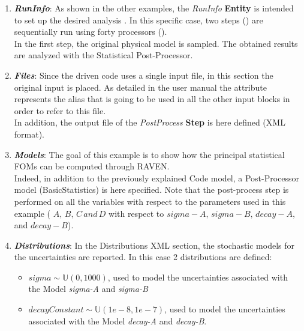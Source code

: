 \begin{enumerate}
   \item \textbf{\textit{RunInfo}}:
   As shown in the other examples, the \textit{RunInfo} \textbf{Entity} is intended  to set up the desired analysis . In this specific case, two steps  () are  sequentially run
   using forty processors ().
   \\In the first step, the original physical model is sampled. The obtained results are  analyzed with the Statistical Post-Processor.
   \item \textbf{\textit{Files}}:
   Since the driven code uses a single input file, in this section the original input is placed. As detailed in the user manual
   the attribute   represents the alias that is going to be
   used in all the other input blocks in order to refer to this file.
   \\In addition, the output file of the \textit{PostProcess} \textbf{Step} is
   here defined (XML format).
   \item \textbf{\textit{Models}}:
 The goal of this example is to show how the
 principal statistical FOMs can be computed through RAVEN.
 \\Indeed, in addition to the previously explained Code
 model, a Post-Processor model (BasicStatistics) is here specified.
Note that the post-process step is
performed on all the variables with respect to the parameters used in this example ( $A,\, B,\, C \, and \, D$
with respect to $sigma-A,\,sigma-B,\, decay-A,$ and $decay-B$).
   \item \textbf{\textit{Distributions}}:
  In the Distributions XML section, the stochastic models for the
  uncertainties are reported. In
  this case 2 distributions are defined:
  \begin{itemize}
    \item $sigma \sim \mathbb{U}(0,1000)$, used to model the uncertainties
    associated with  the Model \textit{sigma-A} and \textit{sigma-B}
    \item  $decayConstant \sim \mathbb{U}(1e-8,1e-7)$,  used to
    model the uncertainties
    associated with  the Model \textit{decay-A} and \textit{decay-B}.

\end{itemize}
\end{enumerate}
